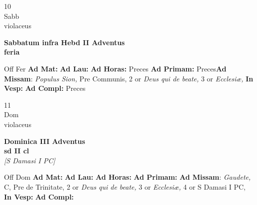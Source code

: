 \documentclass[10pt, openany]{book}
\begin{document}
    \begin{center}
        \begin{minipage}{3.5in}
            \vspace{2em}
            \begin{minipage}{0.5in}
                {\Huge 10} \\
                {\normalsize Sabb} \\
                {\normalsize violaceus}
            \end{minipage}
            \begin{minipage}{3.0in}
                \textbf{ \large Sabbatum infra Hebd II Adventus \\
                \textnormal{\normalsize feria}} \\ 
            \end{minipage}
            \begin{justify}Off Fer
                \textbf{Ad Mat: }
                \textbf{Ad Lau: }
                \textbf{Ad Horas: }Preces
                \textbf{Ad Primam: }Preces\textbf{Ad Missam}: \textit{Populus Sion,} Pre Communis, 2 or \textit{Deus qui de beate,} 3 or \textit{Ecclesiæ,}  
                \textbf{In Vesp: }
                \textbf{Ad Compl: }Preces
            \end{justify}
        \end{minipage}
    \end{center}

    \begin{center}
        \begin{minipage}{3.5in}
            \vspace{2em}
            \begin{minipage}{0.5in}
                {\Huge 11} \\
                {\normalsize Dom} \\
                {\normalsize violaceus}
            \end{minipage}
            \begin{minipage}{3.0in}
                \textbf{ \large Dominica III Adventus \\
                \textnormal{\normalsize sd II cl}} \\ \textit{[S Damasi I PC]} \\ 
            \end{minipage}
            \begin{justify}Off Dom
                \textbf{Ad Mat: }
                \textbf{Ad Lau: }
                \textbf{Ad Horas: }
                \textbf{Ad Primam: }\textbf{Ad Missam}: \textit{Gaudete,} C, Pre de Trinitate, 2 or \textit{Deus qui de beate,} 3 or \textit{Ecclesiæ,} 4 or S Damasi I PC,  
                \textbf{In Vesp: }
                \textbf{Ad Compl: }
            \end{justify}
        \end{minipage}
    \end{center}
\end{document}
